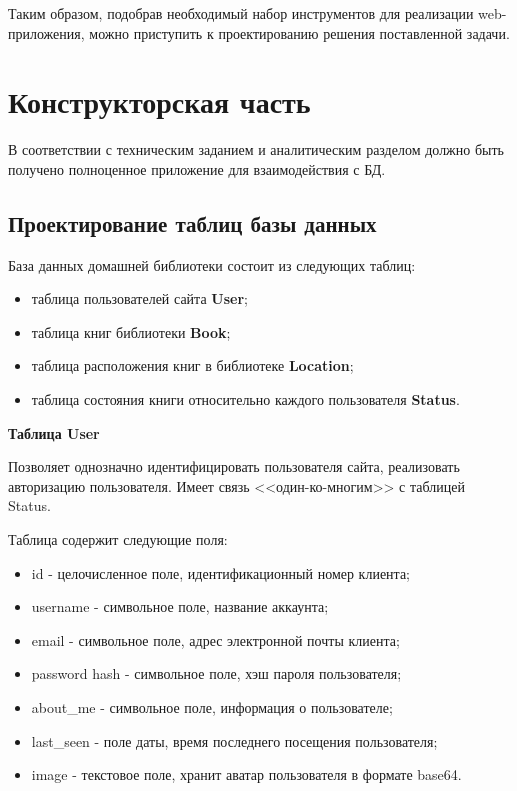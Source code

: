 Таким образом, подобрав необходимый набор инструментов для реализации web-приложения, можно приступить к проектированию решения поставленной задачи.


\newpage
\section{Конструкторская часть}%
\setcounter{section}{2}

В соответствии с техническим заданием и аналитическим разделом должно быть получено полноценное приложение для взаимодействия с БД.

\subsection{Проектирование таблиц базы данных}%
\setcounter{subsection}{1}

База данных домашней библиотеки состоит из следующих таблиц:
\begin{itemize}
	\item таблица пользователей сайта {\bf User};
	\item таблица книг библиотеки {\bf Book};
	\item таблица расположения книг в библиотеке {\bf Location};
	\item таблица состояния книги относительно каждого пользователя {\bf Status}.
\end{itemize}

\hfill \break

{\bf Таблица User}

Позволяет однозначно идентифицировать пользователя сайта, реализовать авторизацию пользователя. Имеет связь <<один-ко-многим>> с таблицей Status. 


Таблица содержит следующие поля:
\begin{itemize}
	\item id - целочисленное поле, идентификационный номер клиента;
	\item username - символьное поле, название аккаунта;
	\item email - символьное поле, адрес электронной почты клиента;
	\item password hash - символьное поле, хэш пароля пользователя;
	\item about\_me - символьное поле, информация о пользователе;
	\item last\_seen - поле даты, время последнего посещения пользователя;
	\item image - текстовое поле, хранит аватар пользователя в формате base64.
\end{itemize}

